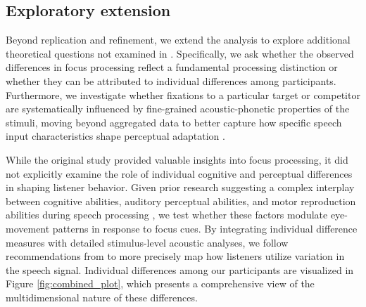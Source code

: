 \subsection{Exploratory extension}

Beyond replication and refinement, we extend the analysis to explore additional theoretical questions not examined in \cite{Ge2021}. Specifically, we ask whether the observed differences in focus processing reflect a fundamental processing distinction or whether they can be attributed to individual differences among participants. Furthermore, we investigate whether fixations to a particular target or competitor are systematically influenced by fine-grained acoustic-phonetic properties of the stimuli, moving beyond aggregated data to better capture how specific speech input characteristics shape perceptual adaptation \citep{xie2023adaptive}.

While the original study provided valuable insights into focus processing, it did not explicitly examine the role of individual cognitive and perceptual differences in shaping listener behavior. Given prior research suggesting a complex interplay between cognitive abilities, auditory perceptual abilities, and motor reproduction abilities during speech processing \citep{saito2022does, bramlett_wiener_24_speechprosody, bakkouche2025effects, Kachlicka_Saito_Tierney_2019}, we test whether these factors modulate eye-movement patterns in response to focus cues. By integrating individual difference measures with detailed stimulus-level acoustic analyses, we follow recommendations from \cite{xie2023adaptive} to more precisely map how listeners utilize variation in the speech signal. Individual differences among our participants are visualized in Figure \ref{fig:combined_plot}, which presents a comprehensive view of the multidimensional nature of these differences. 


